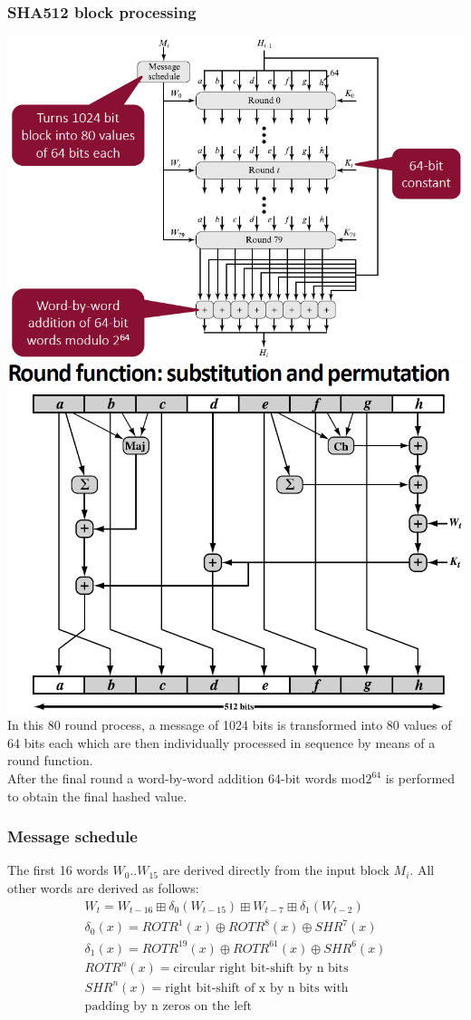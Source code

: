\documentclass[12pt]{article}
\let\amssymbboxplus\boxplus
\renewcommand{\boxplus}{\mathbin{\mathop\amssymbboxplus}}
\begin{document}
 \subsubsection{SHA512 block processing}
 \includegraphics[width=0.8\linewidth]{./slides/L3P2SHA512BLOCK.PNG}\\
 \includegraphics[width=0.8\linewidth]{./slides/L3P2SHA512ROUND.PNG}
 In this 80 round process, a message of 1024 bits is transformed into 80 values of 64 bits each which are then individually processed in sequence by means of a round function.\\
 After the final round a word-by-word addition 64-bit words mod$2^{64}$ is performed to obtain the final hashed value.
 \subsubsection{Message schedule}
 The first 16 words $W_0 .. W_{15}$ are derived directly from the input block $M_i$. All other words are derived as follows:
 \begin{align*}
 	W_t = W_{t-16} \boxplus \delta_0(W_{t-15}) \boxplus W_{t-7} \boxplus \delta_1(W_{t-2})\\
 	\delta_0(x) = ROTR^1(x) \oplus ROTR^8(x) \oplus SHR^7(x)\\
 	\delta_1(x) = ROTR^{19}(x) \oplus ROTR^{61}(x) \oplus SHR^6(x)\\
 	ROTR^n(x) = \text{circular right bit-shift by n bits}\\
 	SHR^n(x) = \text{right bit-shift of x by n bits with}\\
 	 \text{padding by n zeros on the left}
 \end{align*}
 
\end{document}
